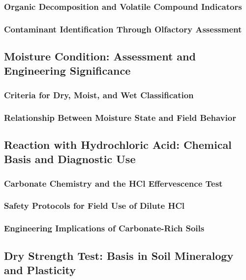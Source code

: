 \subsubsection{Organic Decomposition and Volatile Compound Indicators}

\subsubsection{Contaminant Identification Through Olfactory Assessment}

\subsection{Moisture Condition: Assessment and Engineering Significance}

\subsubsection{Criteria for Dry, Moist, and Wet Classification}

\subsubsection{Relationship Between Moisture State and Field Behavior}

\subsection{Reaction with Hydrochloric Acid: Chemical Basis and Diagnostic Use}

\subsubsection{Carbonate Chemistry and the HCl Effervescence Test}

\subsubsection{Safety Protocols for Field Use of Dilute HCl}

\subsubsection{Engineering Implications of Carbonate-Rich Soils}

\subsection{Dry Strength Test: Basis in Soil Mineralogy and Plasticity}

